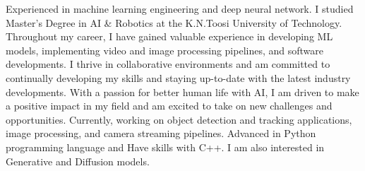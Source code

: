 


\justifying
Experienced in machine learning engineering and deep neural network. I studied Master's Degree in AI \& Robotics at the K.N.Toosi University of Technology. Throughout my career, I have gained valuable experience in developing ML models, implementing video and image processing pipelines, and software developments. I thrive in collaborative environments and am committed to continually developing my skills and staying up-to-date with the latest industry developments. With a passion for better human life with AI, I am driven to make a positive impact in my field and am excited to take on new challenges and opportunities. Currently, working on object detection and tracking applications, image processing, and camera streaming pipelines. Advanced in Python programming language and Have skills with C++. I am also interested in Generative and Diffusion models.

